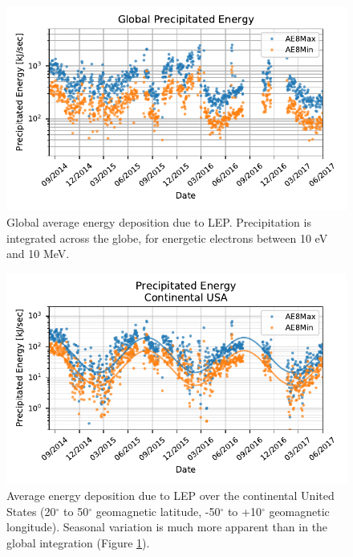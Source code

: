 \begin{figure}[ht]
\begin{center}
\includegraphics{figures/seasonal_precip_rates_global.pdf}
\caption[Global energy deposition due to LEP]{Global average energy deposition due to LEP. Precipitation is integrated across the globe, for energetic electrons between 10 eV and 10 MeV.}
\label{fig:seasonal_precip_rates_global}
\end{center}
\end{figure}
\begin{figure}[h]
\begin{center}
\includegraphics{figures/seasonal_precip_rates_US_only.pdf}
\caption[Global energy deposition due to LEP over the continental United States]{Average energy deposition due to LEP over the continental United States (20$^\circ$ to 50$^\circ$ geomagnetic latitude, -50$^\circ$ to +10$^\circ$ geomagnetic longitude). Seasonal variation is much more apparent than in the global integration (Figure \ref{fig:seasonal_precip_rates_global}).}
\label{fig:seasonal_precip_rates_US_only}
\end{center}
\end{figure}

